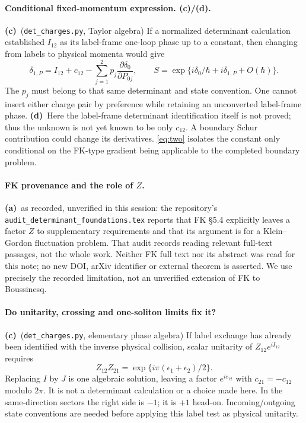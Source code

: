 \documentclass[11pt,a4paper]{article}
\newcommand{\Lc}{\textbf{(c)}}
\newcommand{\Ld}{\textbf{(d)}}
\newcommand{\La}{\textbf{(a)}}
\newcommand{\Ccheck}{\texttt{det\_charges.py}}
\begin{document}
\paragraph{Conditional fixed-momentum expression. \Lc/\Ld.}
\Lc\ (\Ccheck, Taylor algebra) If a normalized determinant calculation
established $I_{12}$ as its label-frame one-loop phase up to a constant,
then changing from labels to physical momenta would give
\begin{equation}
 \delta_{1,P}=I_{12}+c_{12}
       -\sum_{j=1}^2p_j\frac{\partial\delta_0}{\partial P_{0j}},
 \qquad S=\exp\{i\delta_0/\hbar+i\delta_{1,P}+O(\hbar)\}.
 \label{eq:two}
\end{equation}
The $p_j$ must belong to that same determinant and state convention.
One cannot insert either charge pair by preference while retaining an
unconverted label-frame phase. \Ld\ Here the label-frame determinant
identification itself is not proved; thus the unknown is not yet known to
be only $c_{12}$. A boundary Schur contribution could change its derivatives.
\eqref{eq:two} isolates the constant only conditional on the FK-type gradient
being applicable to the completed boundary problem.

\paragraph{FK provenance and the role of $Z$.}
\La\ as recorded, unverified in this session: the repository's
\texttt{audit\_determinant\_foundations.tex} reports that FK \S5.4 explicitly
leaves a factor $Z$ to supplementary requirements and that its argument is
for a Klein--Gordon fluctuation problem. That audit records reading relevant
full-text passages, not the whole work. Neither FK full text nor its abstract
was read for this note; no new DOI, arXiv identifier or external theorem is
asserted. We use precisely the recorded limitation, not an unverified
extension of FK to Boussinesq.

\paragraph{Do unitarity, crossing and one-soliton limits fix it?}
\Lc\ (\Ccheck, elementary phase algebra) If label exchange has already been
identified with the inverse physical collision, scalar unitarity of
$Z_{12}e^{iI_{12}}$ requires
\begin{equation}
 Z_{12}Z_{21}=\exp\{i\pi(\epsilon_1+\epsilon_2)/2\}.
\end{equation}
Replacing $I$ by $J$ is one algebraic solution, leaving a factor
$e^{ic_{12}}$ with $c_{21}=-c_{12}$ modulo $2\pi$. It is not a determinant
calculation or a choice made here. In the same-direction sectors the right
side is $-1$; it is $+1$ head-on. Incoming/outgoing state conventions are
needed before applying this label test as physical unitarity.
\end{document}
